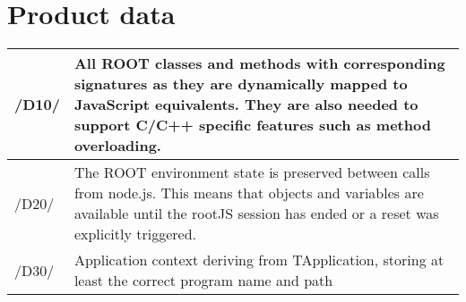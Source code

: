 \chapter{Product data}



\begin{longtable}{|p{1cm} | p{15cm}|}
  \hline
  /D10/ & All ROOT classes and methods with corresponding signatures as they are dynamically mapped to JavaScript equivalents. They are also needed to support C/C++ specific features such as method overloading.\\
  \hline
  /D20/ & The ROOT environment state is preserved between calls from node.js. This means that objects and variables are available until the rootJS session has ended or a reset was explicitly triggered.\\
  \hline
  /D30/ & Application context deriving from TApplication, storing at least the correct program name and path\\
  \hline
\end{longtable}
